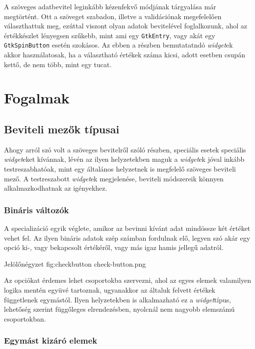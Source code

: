 A szöveges adatbevitel leginkább kézenfekvő módjának tárgyalása már megtörtént. Ott a szöveget szabadon, illetve a validációnak megefelelően választhattuk meg, ezúttal viszont olyan adatok bevitelével foglalkozunk, ahol az értékkészlet lényegsen szűkebb, mint ami egy \texttt{GtkEntry}, vagy akát egy \texttt{GtkSpinButton} esetén szokásos. Az ebben a részben bemutatatndó \textit{widget}ek akkor használatosak, ha a választható értékek száma kicsi, adott esetben csupán kettő, de nem több, mint egy tucat.

\section{Fogalmak}

\subsection{Beviteli mezők típusai}

Ahogy arról szó volt a szöveges bevitelről szóló részben, speciális esetek speciális \textit{widget}eket kívánnak, lévén az ilyen helyzetekben maguk a \textit{widget}ek jóval inkább testreszabhatóak, mint egy általános helyzetnek is megfelelő szöveges beviteli mező. A testreszabott \textit{widget}ek megjelenése, beviteli módszereik könnyen alkalmazkodhatnak az igényekhez.

\subsubsection{Bináris változók}

A specializáció egyik véglete, amikor az bevinni kívánt adat mindössze két értéket vehet fel. Az ilyen bináris adatok szép számban fordulnak elő, legyen szó akár egy opció ki-, vagy bekapcsolt értékéről, vagy más igaz hamis jellegű adatról.

{Jelölőnégyzet\cite{gtkref}}
{fig:checkbutton}
{check-button.png}

Az opciókat érdemes lehet csoportokba szervezni, ahol az egyes elemek valamilyen logika mentén együvé tartoznak, ugyanakkor az általuk felvett értékek függetlenek egymástól. Ilyen helyzetekben is alkalmazható ez a \textit{widget}típus, lehetőség szerint függőleges elrendezésben, nyolcnál nem nagyobb elemszámú csoportokban.

\subsubsection{Egymást kizáró elemek}

